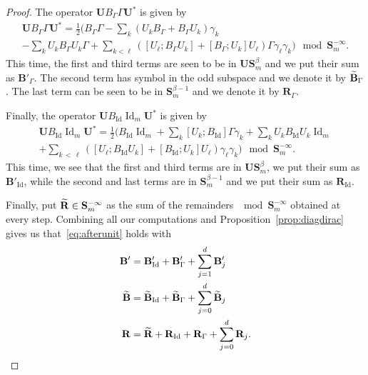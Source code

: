 \documentclass[AHL,Unicode,longabstracts,published]{cedram}
\DeclareMathOperator{\Id}{Id}
\newcommand{\BB}{\mathbf B}
\newcommand{\BS}{\mathbf S}
\newcommand{\BR}{\mathbf R}
\newcommand{\BU}{\mathbf U}
\let\oldtilde\tilde
\renewcommand*{\tilde}[1]{\mathchoice{\widetilde{#1}}{\widetilde{#1}}{\oldtilde{#1}}{\oldtilde{#1}}}
\begin{document}
\begin{proof}
The operator $\BU B_\Gamma \Gamma \BU^*$ is given by
\begin{multline}\label{eq:Gammatrans}
\BU B_\Gamma\Gamma \BU^* =
\frac{1}{2}\Bigg(B_\Gamma \Gamma - \sum_{k}(U_k B_\Gamma + B_\Gamma U_k) \gamma_k \\
- \sum_{k} U_k B_\Gamma U_k \Gamma +
\sum_{k < \ell}\left([U_\ell;B_\Gamma U_k] + [B_\Gamma;U_k]U_\ell \right)\Gamma
\gamma_\ell \gamma_k
\bigg) \mod \BS_m^{-\infty}.
\end{multline}
This time, the first and third terms are seen to be in $\BU\BS^\beta_m$ and we put their sum as $\BB'_\Gamma$. The second term has symbol in the odd subspace and we denote it by $\tilde
\BB_\Gamma$. The last term can be seen to be in $\BS_m^{\beta - 1}$ and we denote it by $\BR_{\Gamma}$.

Finally, the operator $\BU B_{\Id} \Id_m \BU^*$ is given by
\begin{multline}\label{eq:Idtrans}
\BU B_{\Id} \Id_m \BU^* =
\frac{1}{2}\Bigg(B_{\Id} \Id_m +
\sum_{k}[U_k;B_{\Id}]\Gamma \gamma_k + \sum_{k} U_k B_{\Id} U_k \Id_m \\
+\sum_{k\,<\,\ell}\left([U_\ell;B_{\Id}U_k] + [B_{\Id};U_k]U_\ell \right)
\gamma_\ell \gamma_k
\Bigg) \mod \BS_m^{-\infty}.
\end{multline}
This time, we see that the first and third terms are in $\BU\BS_m^\beta$, we put their sum as $\BB'_{\Id}$, while the second and last terms are in $\BS_m^{\beta - 1}$ and we put their sum as $\BR_{\Id}$.

Finally, put $\tilde \BR \in \BS_m^{-\infty}$ as the sum of the remainders $\mod \BS_m^{-\infty}$ obtained at every step. Combining all our computations and Proposition~\ref{prop:diagdirac} gives us that~\eqref{eq:afterunit} holds with
\begin{equation}
\begin{aligned}
\BB' &= \BB'_{\Id} + \BB'_{\Gamma} + \sum_{j=1}^d \BB'_j \\
\tilde \BB &= \tilde \BB_{\Id} + \tilde \BB_{\Gamma} + \sum_{j=0}^d \tilde
\BB_j \\
\BR &= \tilde \BR + \BR_{\Id} + \BR_\Gamma + \sum_{j=0}^d \BR_j.
\end{aligned}\qedhere
\end{equation}
\end{proof}
\end{document}
